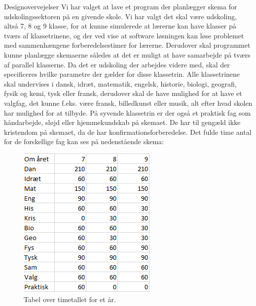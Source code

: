 Designovervejelser
Vi har valget at lave et program der planlægger skema for udskolingssektoren på en givende skole. Vi har valgt det skal være udskoling, altså 7, 8 og 9 klasse, for at kunne simulerede at lærerne kan have klasser på tværs af klassetrinene, og der ved vise at software løsningen kan løse problemet med sammenhængene forberedelsestimer for lærerne. Derudover skal programmet kunne planlægge skemaerne således at det er muligt at have samarbejde på tværs af parallel klasserne.  Da det er udskoling der arbejdes videre med, skal der specificeres hvilke parametre der gælder for disse klassetrin. Alle klassetrinene skal undervises i dansk, idræt, matematik, engelsk, historie, biologi, geografi, fysik og kemi, tysk eller fransk, derudover skal de have mulighed for at have et valgfag, det kunne f.eks. være fransk, billedkunst eller musik, alt efter hvad skolen har mulighed for at tilbyde. På syvende klassetrin er der også et praktisk fag som håndarbejde, sløjd eller hjemmekundskab på skemaet. De har til gengæld ikke kristendom på skemaet, da de har konfirmationsforberedelse. Det fulde time antal for de forskellige fag kan ses på nedenstående skema:
\begin{figure}[!h]
  \centering
  \includegraphics[width=\textwidth]{partials/graphics/antalaftimerpaaetaar.png}
  \caption{Tabel over timetallet for et år.}
  \label{fig:Timetalaar}
\end{figure}

